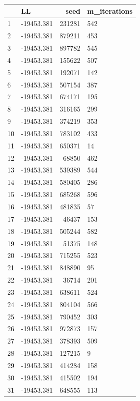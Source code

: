 \documentclass[]{book}
\theoremstyle{definition}
\theoremstyle{definition}
\theoremstyle{definition}
\theoremstyle{remark}
\begin{document}
\begin{tabular}{l|l|r|l}
\hline
  & LL & seed & m\_iterations\\
\hline
1 & -19453.381 & 231281 & 542\\
\hline
2 & -19453.381 & 879211 & 453\\
\hline
3 & -19453.381 & 897782 & 545\\
\hline
4 & -19453.381 & 155622 & 507\\
\hline
5 & -19453.381 & 192071 & 142\\
\hline
6 & -19453.381 & 507154 & 387\\
\hline
7 & -19453.381 & 674171 & 195\\
\hline
8 & -19453.381 & 316165 & 299\\
\hline
9 & -19453.381 & 374219 & 353\\
\hline
10 & -19453.381 & 783102 & 433\\
\hline
11 & -19453.381 & 650371 & 14\\
\hline
12 & -19453.381 & 68850 & 462\\
\hline
13 & -19453.381 & 539389 & 544\\
\hline
14 & -19453.381 & 580405 & 286\\
\hline
15 & -19453.381 & 685268 & 596\\
\hline
16 & -19453.381 & 481835 & 57\\
\hline
17 & -19453.381 & 46437 & 153\\
\hline
18 & -19453.381 & 505244 & 582\\
\hline
19 & -19453.381 & 51375 & 148\\
\hline
20 & -19453.381 & 715255 & 523\\
\hline
21 & -19453.381 & 848890 & 95\\
\hline
22 & -19453.381 & 36714 & 201\\
\hline
23 & -19453.381 & 638611 & 524\\
\hline
24 & -19453.381 & 804104 & 566\\
\hline
25 & -19453.381 & 790452 & 303\\
\hline
26 & -19453.381 & 972873 & 157\\
\hline
27 & -19453.381 & 378393 & 509\\
\hline
28 & -19453.381 & 127215 & 9\\
\hline
29 & -19453.381 & 414284 & 158\\
\hline
30 & -19453.381 & 415502 & 194\\
\hline
31 & -19453.381 & 648555 & 113\\

\end{tabular}
\end{document}
